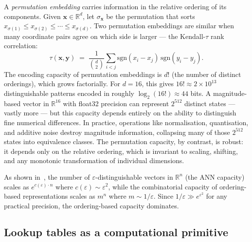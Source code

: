 \documentclass[11pt]{article}
\begin{document}
A \emph{permutation embedding} carries information in the relative ordering of its components.
Given $\mathbf{x} \in \mathbb{R}^d$, let $\sigma_\mathbf{x}$ be the permutation that sorts $x_{\sigma(1)} \le x_{\sigma(2)} \le \cdots \le x_{\sigma(d)}$.
Two permutation embeddings are similar when many coordinate pairs agree on which side is larger --- the Kendall-$\tau$ rank correlation:
\begin{equation}
    \tau(\mathbf{x}, \mathbf{y}) \;=\; \frac{1}{\binom{d}{2}} \sum_{i<j} \mathrm{sgn}(x_i - x_j)\,\mathrm{sgn}(y_i - y_j).
    \label{eq:kendall}
\end{equation}
The encoding capacity of permutation embeddings is $d!$ (the number of distinct orderings), which grows factorially.
For $d = 16$, this gives $16! \approx 2 \times 10^{13}$ distinguishable patterns encoded in roughly $\log_2(16!) \approx 44$ bits.
A magnitude-based vector in $\mathbb{R}^{16}$ with float32 precision can represent $2^{512}$ distinct states --- vastly more --- but this capacity depends entirely on the ability to distinguish fine numerical differences.
In practice, operations like normalisation, quantisation, and additive noise destroy magnitude information, collapsing many of those $2^{512}$ states into equivalence classes.
The permutation capacity, by contrast, is robust: it depends only on the relative ordering, which is invariant to scaling, shifting, and any monotonic transformation of individual dimensions.

As shown in~\cite{ref:manifesto}, the number of $\varepsilon$-distinguishable vectors in $\mathbb{R}^n$ (the ANN capacity) scales as $e^{c(\varepsilon) \cdot n}$ where $c(\varepsilon) \sim \varepsilon^2$, while the combinatorial capacity of ordering-based representations scales as $m^n$ where $m \sim 1/\varepsilon$.
Since $1/\varepsilon \gg e^{\varepsilon^2}$ for any practical precision, the ordering-based capacity dominates.

\subsection{Lookup tables as a computational primitive}
\label{sec:lut_primitive}
\end{document}
